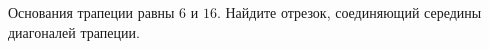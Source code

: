 \begin{ex}
	\begin{condition}
		Основания трапеции равны \( 6  \) и \( 16 \). Найдите отрезок, соединяющий середины диагоналей трапеции.
	\end{condition}
\end{ex}